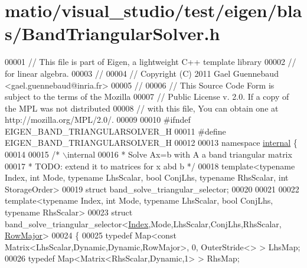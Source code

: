 \hypertarget{matio_2visual__studio_2test_2eigen_2blas_2_band_triangular_solver_8h_source}{}\section{matio/visual\+\_\+studio/test/eigen/blas/\+Band\+Triangular\+Solver.h}
\label{matio_2visual__studio_2test_2eigen_2blas_2_band_triangular_solver_8h_source}

\begin{DoxyCode}
00001 \textcolor{comment}{// This file is part of Eigen, a lightweight C++ template library}
00002 \textcolor{comment}{// for linear algebra.}
00003 \textcolor{comment}{//}
00004 \textcolor{comment}{// Copyright (C) 2011 Gael Guennebaud <gael.guennebaud@inria.fr>}
00005 \textcolor{comment}{//}
00006 \textcolor{comment}{// This Source Code Form is subject to the terms of the Mozilla}
00007 \textcolor{comment}{// Public License v. 2.0. If a copy of the MPL was not distributed}
00008 \textcolor{comment}{// with this file, You can obtain one at http://mozilla.org/MPL/2.0/.}
00009 
00010 \textcolor{preprocessor}{#ifndef EIGEN\_BAND\_TRIANGULARSOLVER\_H}
00011 \textcolor{preprocessor}{#define EIGEN\_BAND\_TRIANGULARSOLVER\_H}
00012 
00013 \textcolor{keyword}{namespace }\hyperlink{namespaceinternal}{internal} \{
00014 
00015  \textcolor{comment}{/* \(\backslash\)internal}
00016 \textcolor{comment}{  * Solve Ax=b with A a band triangular matrix}
00017 \textcolor{comment}{  * TODO: extend it to matrices for x abd b */}
00018 \textcolor{keyword}{template}<\textcolor{keyword}{typename} Index, \textcolor{keywordtype}{int} Mode, \textcolor{keyword}{typename} LhsScalar, \textcolor{keywordtype}{bool} ConjLhs, \textcolor{keyword}{typename} RhsScalar, \textcolor{keywordtype}{int} StorageOrder>
00019 \textcolor{keyword}{struct }band\_solve\_triangular\_selector;
00020 
00021 
00022 \textcolor{keyword}{template}<\textcolor{keyword}{typename} Index, \textcolor{keywordtype}{int} Mode, \textcolor{keyword}{typename} LhsScalar, \textcolor{keywordtype}{bool} ConjLhs, \textcolor{keyword}{typename} RhsScalar>
00023 \textcolor{keyword}{struct }band\_solve\_triangular\_selector<\hyperlink{namespace_eigen_a62e77e0933482dafde8fe197d9a2cfde}{Index},Mode,LhsScalar,ConjLhs,RhsScalar,
      \hyperlink{group__enums_ggaacded1a18ae58b0f554751f6cdf9eb13acfcde9cd8677c5f7caf6bd603666aae3}{RowMajor}>
00024 \{
00025   \textcolor{keyword}{typedef} Map<const Matrix<LhsScalar,Dynamic,Dynamic,RowMajor>, 0, OuterStride<> > LhsMap;
00026   \textcolor{keyword}{typedef} Map<Matrix<RhsScalar,Dynamic,1> > RhsMap;

\end{DoxyCode}
